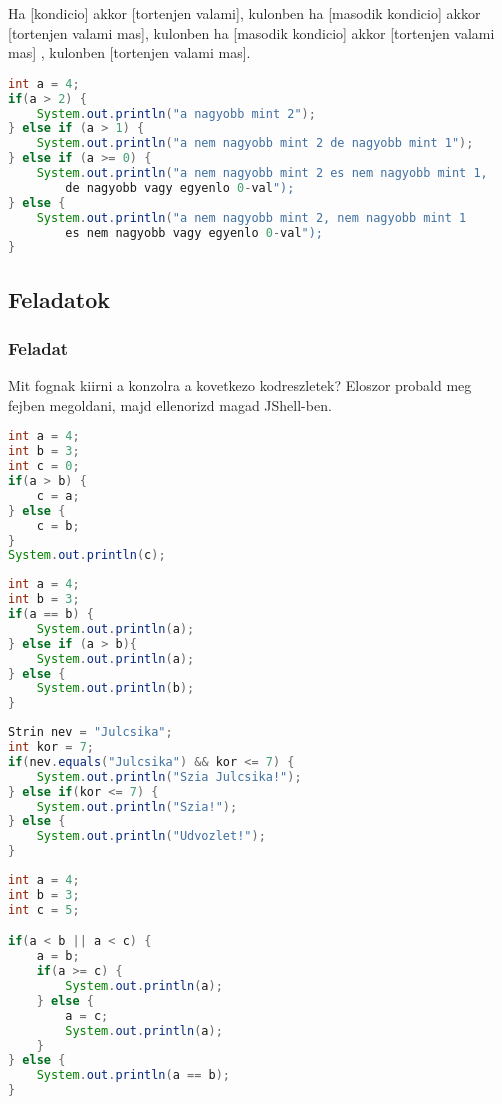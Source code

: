 \documentclass{article}
\begin{document}
Ha [kondicio] akkor [tortenjen valami], kulonben ha [masodik kondicio] akkor [tortenjen valami mas],  kulonben ha [masodik kondicio] akkor [tortenjen valami mas] , kulonben [tortenjen valami mas].

\begin{lstlisting}[language=Java, caption=If hasznalata]
int a = 4;
if(a > 2) {
    System.out.println("a nagyobb mint 2");
} else if (a > 1) {
    System.out.println("a nem nagyobb mint 2 de nagyobb mint 1");
} else if (a >= 0) {
    System.out.println("a nem nagyobb mint 2 es nem nagyobb mint 1,
        de nagyobb vagy egyenlo 0-val");
} else {
    System.out.println("a nem nagyobb mint 2, nem nagyobb mint 1
        es nem nagyobb vagy egyenlo 0-val");
}
\end{lstlisting}

\subsection{Feladatok}

\subsubsection{Feladat}

Mit fognak kiirni a konzolra a kovetkezo kodreszletek? Eloszor probald meg fejben megoldani, majd ellenorizd magad JShell-ben.

\begin{lstlisting}[language=Java, caption=Muvelet 1.]
int a = 4;
int b = 3;
int c = 0;
if(a > b) {
    c = a;
} else {
    c = b;
}
System.out.println(c);
\end{lstlisting}

\begin{lstlisting}[language=Java, caption=Muvelet 2.]
int a = 4;
int b = 3;
if(a == b) {
    System.out.println(a);
} else if (a > b){
    System.out.println(a);
} else {
    System.out.println(b);
}
\end{lstlisting}

\newpage

\begin{lstlisting}[language=Java, caption=Muvelet 3.]
Strin nev = "Julcsika";
int kor = 7;
if(nev.equals("Julcsika") && kor <= 7) {
    System.out.println("Szia Julcsika!");
} else if(kor <= 7) {
    System.out.println("Szia!");
} else {
    System.out.println("Udvozlet!");
}
\end{lstlisting}

\begin{lstlisting}[language=Java, caption=Muvelet 4.]
int a = 4;
int b = 3;
int c = 5;

if(a < b || a < c) {
    a = b;
    if(a >= c) {
        System.out.println(a);
    } else {
        a = c;
        System.out.println(a);
    }
} else {
    System.out.println(a == b);
}

\end{lstlisting}
\end{document}
